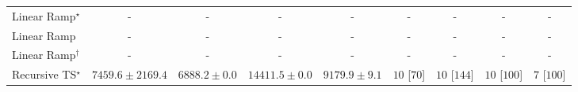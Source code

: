 \begin{tabular}{l|cccc|cccc|}
Linear Ramp$^\star$ & {\cellcolor[HTML]{000000}} \color[HTML]{F1F1F1} {\cellcolor{white}} \color{black} - & {\cellcolor[HTML]{000000}} \color[HTML]{F1F1F1} {\cellcolor{white}} \color{black} - & {\cellcolor[HTML]{000000}} \color[HTML]{F1F1F1} {\cellcolor{white}} \color{black} - & {\cellcolor[HTML]{000000}} \color[HTML]{F1F1F1} {\cellcolor{white}} \color{black} - & {\cellcolor[HTML]{000000}} \color[HTML]{F1F1F1} {\cellcolor{white}} \color{black} - & {\cellcolor[HTML]{000000}} \color[HTML]{F1F1F1} {\cellcolor{white}} \color{black} - & {\cellcolor[HTML]{000000}} \color[HTML]{F1F1F1} {\cellcolor{white}} \color{black} - & {\cellcolor[HTML]{000000}} \color[HTML]{F1F1F1} {\cellcolor{white}} \color{black} - \\
Linear Ramp & {\cellcolor[HTML]{000000}} \color[HTML]{F1F1F1} {\cellcolor{white}} \color{black} - & {\cellcolor[HTML]{000000}} \color[HTML]{F1F1F1} {\cellcolor{white}} \color{black} - & {\cellcolor[HTML]{000000}} \color[HTML]{F1F1F1} {\cellcolor{white}} \color{black} - & {\cellcolor[HTML]{000000}} \color[HTML]{F1F1F1} {\cellcolor{white}} \color{black} - & {\cellcolor[HTML]{000000}} \color[HTML]{F1F1F1} {\cellcolor{white}} \color{black} - & {\cellcolor[HTML]{000000}} \color[HTML]{F1F1F1} {\cellcolor{white}} \color{black} - & {\cellcolor[HTML]{000000}} \color[HTML]{F1F1F1} {\cellcolor{white}} \color{black} - & {\cellcolor[HTML]{000000}} \color[HTML]{F1F1F1} {\cellcolor{white}} \color{black} - \\
Linear Ramp$^\dagger$ & {\cellcolor[HTML]{000000}} \color[HTML]{F1F1F1} {\cellcolor{white}} \color{black} - & {\cellcolor[HTML]{000000}} \color[HTML]{F1F1F1} {\cellcolor{white}} \color{black} - & {\cellcolor[HTML]{000000}} \color[HTML]{F1F1F1} {\cellcolor{white}} \color{black} - & {\cellcolor[HTML]{000000}} \color[HTML]{F1F1F1} {\cellcolor{white}} \color{black} - & {\cellcolor[HTML]{000000}} \color[HTML]{F1F1F1} {\cellcolor{white}} \color{black} - & {\cellcolor[HTML]{000000}} \color[HTML]{F1F1F1} {\cellcolor{white}} \color{black} - & {\cellcolor[HTML]{000000}} \color[HTML]{F1F1F1} {\cellcolor{white}} \color{black} - & {\cellcolor[HTML]{000000}} \color[HTML]{F1F1F1} {\cellcolor{white}} \color{black} - \\
Recursive TS$^\star$ & {\cellcolor[HTML]{FEFFE2}} \color[HTML]{000000} $7459.6\pm 2169.4$ & {\cellcolor[HTML]{FFFFE5}} \color[HTML]{000000} $6888.2\pm 0.0$ & {\cellcolor[HTML]{F1FAB5}} \color[HTML]{000000} $14411.5\pm 0.0$ & {\cellcolor[HTML]{FCFED6}} \color[HTML]{000000} $9179.9\pm 9.1$ & {\cellcolor[HTML]{49006A}} \color[HTML]{F1F1F1} $10$ [$70$] & {\cellcolor[HTML]{49006A}} \color[HTML]{F1F1F1} $10$ [$144$] & {\cellcolor[HTML]{49006A}} \color[HTML]{F1F1F1} $10$ [$100$] & {\cellcolor[HTML]{CD238F}} \color[HTML]{F1F1F1} $7$ [$100$] \\

\end{tabular}
